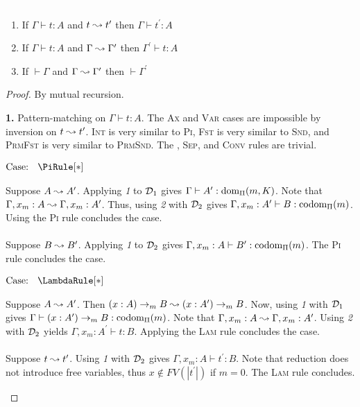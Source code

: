 \begin{lemma}
    \textcolor{white}{\_}
    \begin{enumerate}
        \item If $\Gamma \vdash t : A$ and $t \leadsto t^\prime$ then $\Gamma \vdash t^\prime : A$
        \item If $\Gamma \vdash t : A$ and $\Gamma \leadsto \Gamma^\prime$ then $\Gamma^\prime \vdash t : A$
        \item If $\vdash \Gamma$ and $\Gamma \leadsto \Gamma^\prime$ then $\vdash \Gamma^\prime$
    \end{enumerate}
    \label{lem:2:preservation_no_type_step}
\end{lemma}
\begin{proof}
    By mutual recursion.

    \noindent \textbf{1.} Pattern-matching on $\Gamma \vdash t : A$.
    The \textsc{Ax} and \textsc{Var} cases are impossible by inversion on $t \leadsto t^\prime$.
    \textsc{Int} is very similar to \textsc{Pi}, \textsc{Fst} is very similar to \textsc{Snd}, and \textsc{PrmFst} is very similar to \textsc{PrmSnd}.
    The , \textsc{Sep}, and \textsc{Conv} rules are trivial.

    $\text{Case: }\begin{array}{c} \PiRule[*] \end{array}$
    \begin{proofcase}
        Suppose $A \leadsto A^\prime$.
        Applying \textit{1} to $\mathcal{D}_{1}$ gives $\Gamma \vdash A^\prime : \mbox{\normalfont dom}_\Pi(m, K)$.
        Note that $\Gamma, x_m : A \leadsto \Gamma, x_m : A^\prime$.
        Thus, using \textit{2} with $\mathcal{D}_{2}$ gives $\Gamma, x_m : A^\prime \vdash B : \mbox{\normalfont codom}_\Pi(m)$.
        Using the \textsc{Pi} rule concludes the case.
        \\ \\
        Suppose $B \leadsto B^\prime$.
        Applying \textit{1} to $\mathcal{D}_{2}$ gives $\Gamma, x_m : A \vdash B^\prime : \mbox{\normalfont codom}_\Pi(m)$.
        The \textsc{Pi} rule concludes the case.
    \end{proofcase}

    $\text{Case: }\begin{array}{c} \LambdaRule[*] \end{array}$
    \begin{proofcase}
        Suppose $A \leadsto A^\prime$.
        Then $(x : A) \to_m B \leadsto (x : A^\prime) \to_m B$.
        Now, using \textit{1} with $\mathcal{D}_{1}$ gives $\Gamma \vdash (x : A^\prime) \to_m B : \mbox{\normalfont codom}_\Pi(m)$.
        Note that $\Gamma, x_m : A \leadsto \Gamma, x_m : A^\prime$.
        Using \textit{2} with $\mathcal{D}_{2}$ yields $\Gamma, x_m : A^\prime \vdash t : B$.
        Applying the \textsc{Lam} rule concludes the case.
        \\ \\
        Suppose $t \leadsto t^\prime$.
        Using \textit{1} with $\mathcal{D}_{2}$ gives $\Gamma, x_m : A \vdash t^\prime : B$.
        Note that reduction does not introduce free variables, thus $x \notin FV(|t^\prime|)$ if $m = 0$.
        The \textsc{Lam} rule concludes.
    \end{proofcase}


\end{proof}
